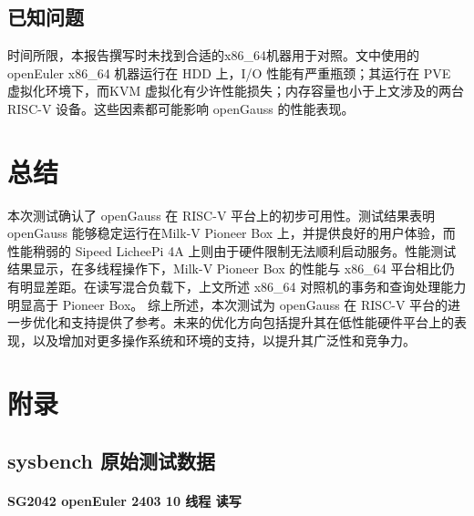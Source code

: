 \documentclass{article}
\begin{document}
\subsection{已知问题}

时间所限，本报告撰写时未找到合适的x86\_64机器用于对照。文中使用的 openEuler x86\_64 机器运行在 HDD 上，I/O 性能有严重瓶颈；其运行在 PVE 虚拟化环境下，而KVM 虚拟化有少许性能损失；内存容量也小于上文涉及的两台 RISC-V 设备。这些因素都可能影响 openGauss 的性能表现。

\section{总结}

本次测试确认了 openGauss 在 RISC-V 平台上的初步可用性。测试结果表明 openGauss 能够稳定运行在Milk-V Pioneer Box 上，并提供良好的用户体验，而性能稍弱的 Sipeed LicheePi 4A 上则由于硬件限制无法顺利启动服务。性能测试结果显示，在多线程操作下，Milk-V Pioneer Box 的性能与 x86\_64 平台相比仍有明显差距。在读写混合负载下，上文所述 x86\_64 对照机的事务和查询处理能力明显高于 Pioneer Box。
综上所述，本次测试为 openGauss 在 RISC-V 平台的进一步优化和支持提供了参考。未来的优化方向包括提升其在低性能硬件平台上的表现，以及增加对更多操作系统和环境的支持，以提升其广泛性和竞争力。

\newpage
\appendix

\section{附录}

\subsection{sysbench 原始测试数据}

\paragraph{SG2042 openEuler 2403 10 线程 读写}
\end{document}
